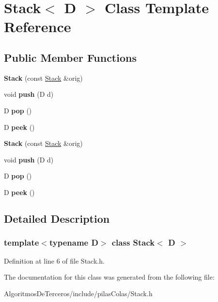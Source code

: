 \hypertarget{class_stack}{}\section{Stack$<$ D $>$ Class Template Reference}
\label{class_stack}
\subsection*{Public Member Functions}
\begin{DoxyCompactItemize}
\item 
\mbox{\label{class_stack_a55e5793404d42ba905f1a7ab90092807}} 
{\bfseries Stack} (const \hyperlink{class_stack}{Stack} \&orig)
\item 
\mbox{\label{class_stack_acf4211784a34b61ed4ba49272f23351f}} 
void {\bfseries push} (D d)
\item 
\mbox{\label{class_stack_a54e8fd6fd2a8b828b7b66f171499e956}} 
D {\bfseries pop} ()
\item 
\mbox{\label{class_stack_a5717795349538863baaeafe7e25df76a}} 
D {\bfseries peek} ()
\item 
\mbox{\label{class_stack_a55e5793404d42ba905f1a7ab90092807}} 
{\bfseries Stack} (const \hyperlink{class_stack}{Stack} \&orig)
\item 
\mbox{\label{class_stack_acf4211784a34b61ed4ba49272f23351f}} 
void {\bfseries push} (D d)
\item 
\mbox{\label{class_stack_a54e8fd6fd2a8b828b7b66f171499e956}} 
D {\bfseries pop} ()
\item 
\mbox{\label{class_stack_a5717795349538863baaeafe7e25df76a}} 
D {\bfseries peek} ()
\end{DoxyCompactItemize}


\subsection{Detailed Description}
\subsubsection*{template$<$typename D$>$\newline
class Stack$<$ D $>$}



Definition at line 6 of file Stack.\+h.



The documentation for this class was generated from the following file\+:\begin{DoxyCompactItemize}
\item 
Algoritmos\+De\+Terceros/include/pilas\+Colas/Stack.\+h\end{DoxyCompactItemize}
